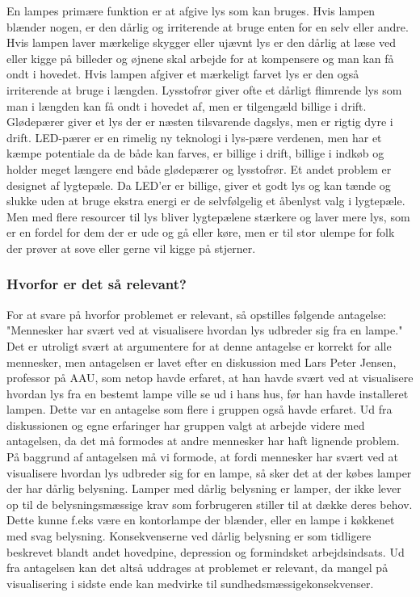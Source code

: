 En lampes primære funktion er at afgive lys som kan bruges. Hvis lampen blænder nogen, er den dårlig og irriterende at bruge enten for en selv eller andre. Hvis lampen laver mærkelige skygger eller ujævnt lys er den dårlig at læse ved eller kigge på billeder og øjnene skal arbejde for at kompensere og man kan få ondt i hovedet. Hvis lampen afgiver et mærkeligt farvet lys er den også irriterende at bruge i længden. Lysstofrør giver ofte et dårligt flimrende lys som man i længden kan få ondt i hovedet af, men er tilgengæld billige i drift. Glødepærer giver et lys der er næsten tilsvarende dagslys, men er rigtig dyre i drift\cite{videnskab_dk_led}. LED-pærer er en rimelig ny teknologi i lys-pære verdenen, men har et kæmpe potentiale da de både kan farves, er billige i drift, billige i indkøb og holder meget længere end både glødepærer og lysstofrør. Et andet problem er designet af lygtepæle. Da LED'er er billige, giver et godt lys og kan tænde og slukke uden at bruge ekstra energi er de selvfølgelig et åbenlyst valg i lygtepæle. Men med flere resourcer til lys bliver lygtepælene stærkere og laver mere lys, som er en fordel for dem der er ude og gå eller køre, men er til stor ulempe for folk der prøver at sove eller gerne vil kigge på stjerner\cite{dr_dk_lysforurening}.


\subsubsection{Hvorfor er det så relevant?}

For at svare på hvorfor problemet er relevant, så opstilles følgende antagelse:
"Mennesker har svært ved at visualisere hvordan lys udbreder sig fra en lampe." Det er utroligt svært at argumentere for at denne antagelse er korrekt for alle mennesker, men antagelsen er lavet efter en diskussion med Lars Peter Jensen, professor på AAU, som netop havde erfaret, at han havde svært ved at visualisere hvordan lys fra en bestemt lampe ville se ud i hans hus, før han havde installeret lampen. Dette var en antagelse som flere i gruppen også havde erfaret. Ud fra diskussionen og egne erfaringer har gruppen valgt at arbejde videre med antagelsen, da det må formodes at andre mennesker har haft lignende problem. \newline
På baggrund af antagelsen må vi formode, at fordi mennesker har svært ved at visualisere hvordan lys udbreder sig for en lampe, så sker det at der købes lamper der har dårlig belysning. Lamper med dårlig belysning er lamper, der ikke lever op til de belysningsmæssige krav som forbrugeren stiller til at dække deres behov. Dette kunne f.eks være en kontorlampe der blænder, eller en lampe i køkkenet med svag belysning. Konsekvenserne ved dårlig belysning er som tidligere beskrevet blandt andet hovedpine, depression og formindsket arbejdsindsats. Ud fra antagelsen kan det altså uddrages at problemet er relevant, da mangel på visualisering i sidste ende kan medvirke til sundhedsmæssigekonsekvenser.